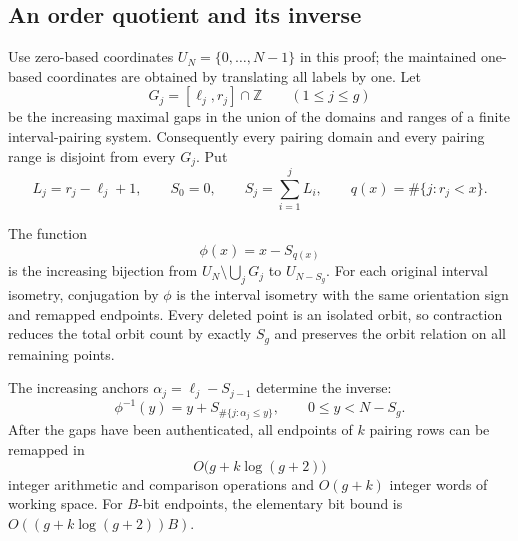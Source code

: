 \subsection{An order quotient and its inverse}

Use zero-based coordinates $U_N=\{0,\ldots,N-1\}$ in this proof;
the maintained one-based coordinates are obtained by translating all labels
by one.  Let
\[
 G_j=[\ell_j,r_j]\cap\mathbb Z\qquad(1\le j\le g)
\]
be the increasing maximal gaps in the union of the domains and ranges of a
finite interval-pairing system.  Consequently every pairing domain and every
pairing range is disjoint from every $G_j$.  Put
\[
 L_j=r_j-\ell_j+1,\qquad S_0=0,\qquad
 S_j=\sum_{i=1}^j L_i,\qquad
 q(x)=\#\{j:r_j<x\}.
\]

\begin{theorem}
\label{thm:prefix-replay}
The function
\[
 \phi(x)=x-S_{q(x)}
\]
is the increasing bijection from $U_N\setminus\bigcup_jG_j$ to
$U_{N-S_g}$.  For each original interval isometry, conjugation by $\phi$
is the interval isometry with the same orientation sign and remapped
endpoints.  Every deleted point is an isolated orbit, so contraction reduces
the total orbit count by exactly $S_g$ and preserves the orbit relation on
all remaining points.

The increasing anchors $\alpha_j=\ell_j-S_{j-1}$ determine the inverse:
\[
 \phi^{-1}(y)=y+S_{\#\{j:\alpha_j\le y\}},\qquad
 0\le y<N-S_g.
\]
After the gaps have been authenticated, all endpoints of $k$ pairing rows
can be remapped in
\[
 O\bigl(g+k\log(g+2)\bigr)
\]
integer arithmetic and comparison operations and $O(g+k)$ integer words of
working space.  For $B$-bit endpoints, the elementary bit bound is
$O((g+k\log(g+2))B)$.
\end{theorem}

